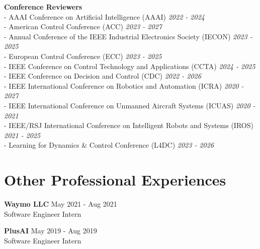 \documentclass[letterpaper,10pt]{article}
\begin{document}
\hspace*{0.5cm} \textbf{Conference Reviewers} \\
\hspace*{0.5cm} - AAAI Conference on Artificial Intelligence (AAAI) \hfill \emph{2022 - 2024} \\
\hspace*{0.5cm} - American Control Conference (ACC) \hfill \emph{2023 - 2027} \\
\hspace*{0.5cm} - Annual Conference of the IEEE Industrial Electronics Society (IECON) \hfill \emph{2023 - 2025} \\
\hspace*{0.5cm} - European Control Conference (ECC) \hfill \emph{2023 - 2025} \\
\hspace*{0.5cm} - IEEE Conference on Control Technology and Applications (CCTA) \hfill \emph{2024 - 2025} \\
\hspace*{0.5cm} - IEEE Conference on Decision and Control (CDC) \hfill \emph{2022 - 2026} \\
\hspace*{0.5cm} - IEEE International Conference on Robotics and Automation (ICRA) \hfill \emph{2020 - 2027} \\
\hspace*{0.5cm} - IEEE International Conference on Unmanned Aircraft Systems (ICUAS) \hfill \emph{2020 - 2021} \\
\hspace*{0.5cm} - IEEE/RSJ International Conference on Intelligent Robots and Systems (IROS) \hfill \emph{2021 - 2025} \\
\hspace*{0.5cm} - Learning for Dynamics \& Control Conference (L4DC) \hfill \emph{2023 - 2026} \\

\section{Other Professional Experiences}
\hspace*{0.5cm} \textbf{Waymo LLC} \hfill May 2021 - Aug 2021 \\
\hspace*{0.5cm} Software Engineer Intern \\
\hfill

\hspace*{0.5cm} \textbf{PlusAI} \hfill May 2019 - Aug 2019 \\
\hspace*{0.5cm} Software Engineer Intern \\
\hfill
\end{document}

